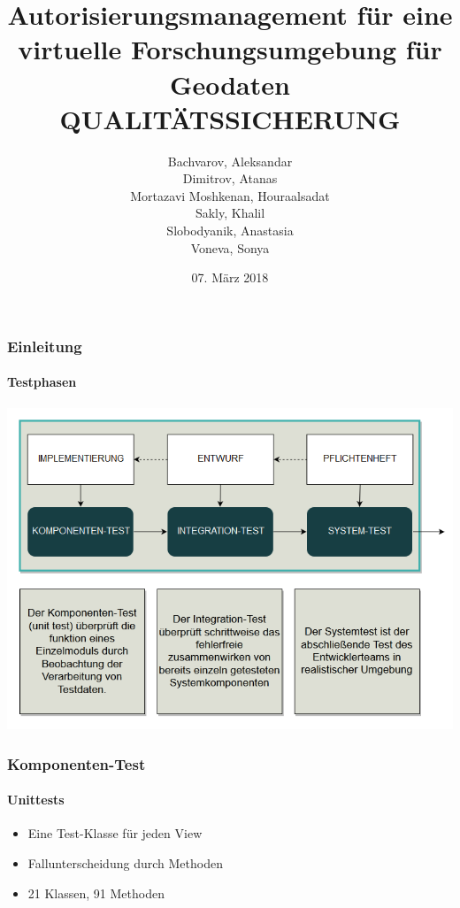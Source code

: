 \documentclass{beamer}
\title[Autorisierungsmanagement für eine virtuelle
Forschungsumgebung für Geodaten: Qualitätssicherung]{Autorisierungsmanagement für eine virtuelle
Forschungsumgebung für Geodaten \\ \textbf{QUALITÄTSSICHERUNG}} %
\author[]{
Bachvarov, Aleksandar\\
Dimitrov, Atanas\\
Mortazavi Moshkenan, Houraalsadat\\
Sakly, Khalil\\
Slobodyanik, Anastasia\\
Voneva, Sonya
} %
\institute[] %
{
Karlsruher Institut für Technologie %

}
\date{07. März 2018} %
\begin{document}
\begin{frame}[plain]
\titlepage %
\end{frame}




\begin{frame}
\frametitle{Einleitung}
\framesubtitle{Testphasen}

\begin{center}
\includegraphics[height=\textheight]{res/testphasen.png}
\end{center}

\end{frame}
\begin{frame}

\frametitle{Komponenten-Test}
\framesubtitle{Unittests}
\begin{itemize}
\item<1-3> Eine Test-Klasse für jeden View
\item<2-3> Fallunterscheidung durch Methoden
\item<3> 21 Klassen, 91 Methoden
\end{itemize}


\end{frame}
\end{document}
